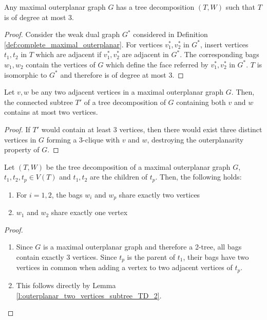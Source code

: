 
\begin{lemma}\label{l:outerplanar_tree_decomposition}
	Any maximal outerplanar graph $G$ has a tree decomposition $(T,W)$ such that $T$ is of degree at most 3.
\end{lemma}
\begin{proof}
	Consider the weak dual graph $G^*$ considered in Definition \ref{def:complete_maximal_outerplanar}. For vertices $v_1^*,v_2^*$ in $G^*$, insert vertices $t_1,t_2$ in $T$ which are adjacent if $v_1^*,v_2^*$ are adjacent in $G^*$. The corresponding bags $w_1, w_2$ contain the vertices of $G$ which define the face referred by $v_1^*,v_2^*$ in $G^*$. $T$ is isomorphic to $G^*$ and therefore is of degree at most 3.
\end{proof}


\begin{lemma}\label{l:outerplanar_two_vertices_subtree_TD_2}
	Let $v,w$ be any two adjacent vertices in a maximal outerplanar graph $G$. Then, the connected subtree $T'$ of a tree decomposition of $G$ containing both $v$ and $w$ contains at most two vertices.
\end{lemma}
\begin{proof}
	If $T'$ would contain at least 3 vertices, then there would exist three distinct vertices in $G$ forming a 3-clique with $v$ and $w$, destroying the outerplanarity property of $G$.
\end{proof}

\begin{lemma}\label{l:outerplanar_TD_properties}
	Let $(T,W)$ be the tree decomposition of a maximal outerplanar graph $G$, $t_1,t_2,t_p \in V(T)$ and $t_1, t_2$ are the children of $t_p$. Then, the following holds:
	\begin{enumerate}
		\item For $i = 1,2$, the bags $w_i$ and $w_p$ share exactly two vertices
		\item $w_1$ and $w_2$ share exactly one vertex
	\end{enumerate}
\end{lemma}
\begin{proof}
	\begin{enumerate}
		\item Since $G$ is a maximal outerplanar graph and therefore a 2-tree, all bags contain exactly 3 vertices. Since $t_p$ is the parent of $t_1$, their bags have two vertices in common when adding a vertex to two adjacent vertices of $t_p$.
		\item This follows directly by Lemma \ref{l:outerplanar_two_vertices_subtree_TD_2}.
	\end{enumerate}
\end{proof}

